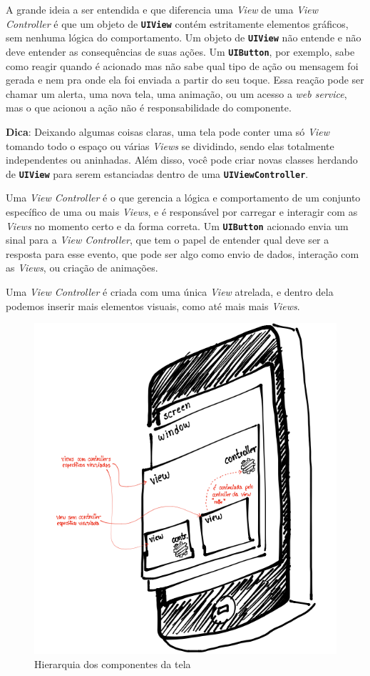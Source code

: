 \documentclass[a4paper,12pt,brazil,oneside]{book}
\begin{document}
A grande ideia a ser entendida e que diferencia uma \emph{View} de uma \emph{View Controller} é que um objeto de \texttt{\textbf{UIView}} contém estritamente elementos gráficos, sem nenhuma lógica do comportamento. Um objeto de \texttt{\textbf{UIView}} não entende e não deve entender as consequências de suas ações. Um \texttt{\textbf{UIButton}}, por exemplo, sabe como reagir quando é acionado mas não sabe qual tipo de ação ou mensagem foi gerada e nem pra onde ela foi enviada a partir do seu toque. Essa reação pode ser chamar um alerta, uma nova tela, uma animação, ou um acesso a \emph{web service}, mas o que acionou a ação não é responsabilidade do componente.

\begin{framed}

\textbf{Dica}: Deixando algumas coisas claras, uma tela pode conter uma só \emph{View} tomando todo o espaço ou várias \emph{Views} se dividindo, sendo elas totalmente independentes ou aninhadas. Além disso, você pode criar novas classes herdando de \texttt{\textbf{UIView}} para serem estanciadas dentro de uma \texttt{\textbf{UIViewController}}.
\end{framed}


Uma \emph{View Controller} é o que gerencia a lógica e comportamento de um conjunto específico de uma ou mais \emph{Views}, e é responsável por carregar e interagir com as \emph{Views} no momento certo e da forma correta. Um \texttt{\textbf{UIButton}} acionado envia um sinal para a \emph{View Controller}, que tem o papel de entender qual deve ser a resposta para esse evento, que pode ser algo como envio de dados, interação com as \emph{Views}, ou criação de animações.

Uma \emph{View Controller} é criada com uma única \emph{View} atrelada, e dentro dela podemos inserir mais elementos visuais, como até mais mais \emph{Views}.

\begin{figure}[H]
  \centering
  \includegraphics[width=.75\textwidth]{figuras/screen_hierarchy.png}
  \caption{Hierarquia dos componentes da tela}
  \label{fig:a}
\end{figure}
\end{document}
